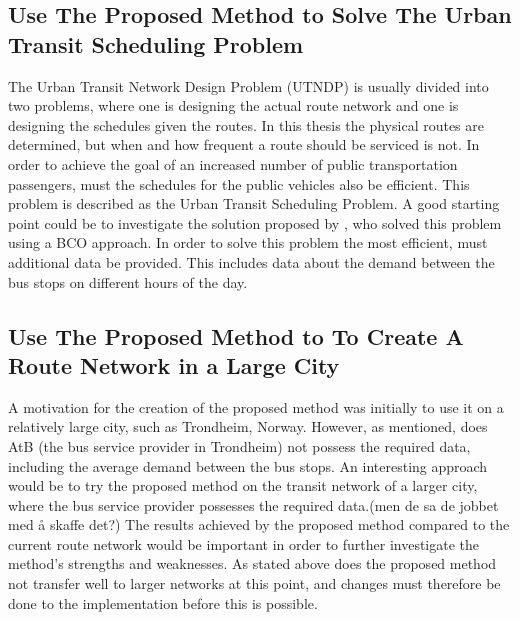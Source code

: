 \subsection*{Use The Proposed Method to Solve The Urban Transit Scheduling Problem}
The Urban Transit Network Design Problem (UTNDP) is usually divided into two problems, where one is designing the actual route network and one is designing the schedules given the routes. In this thesis the physical routes are determined, but when and how frequent a route should be serviced is not. In order to achieve the goal of an increased number of public transportation passengers, must the schedules for the public vehicles also be efficient. This problem is described as the Urban Transit Scheduling Problem. A good starting point could be to investigate the solution proposed by \citet{nikolic14}, who solved this problem using a BCO approach. In order to solve this problem the most efficient, must additional data be provided. This includes data about the demand between the bus stops on different hours of the day. 

\subsection*{Use The Proposed Method to To Create A Route Network in a Large City}
A motivation for the creation of the proposed method was initially to use it on a relatively large city, such as Trondheim, Norway. However, as mentioned, does AtB (the bus service provider in Trondheim) not possess the required data, including the average demand between the bus stops. An interesting approach would be to try the proposed method on the transit network of a larger city, where the bus service provider possesses the required data.(men de sa de jobbet med å skaffe det?) The results achieved by the proposed method compared to the current route network would be important in order to further investigate the method's strengths and weaknesses. As stated above does the proposed method not transfer well to larger networks at this point, and changes must therefore be done to the implementation before this is possible. 






